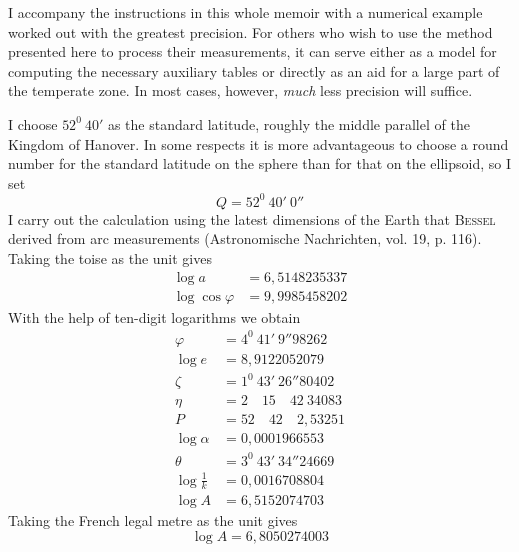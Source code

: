 \indent I accompany the instructions in this whole memoir with a numerical example worked out with the greatest precision. For others who wish to use the method presented here to process their measurements, it can serve either as a model for computing the necessary auxiliary tables or directly as an aid for a large part of the temperate zone. In most cases, however, \textit{much} less precision will suffice.

I choose \(52^0\ 40'\) as the standard latitude, roughly the middle parallel of the Kingdom of Hanover. In some respects it is more advantageous to choose a round number for the standard latitude on the sphere than for that on the ellipsoid, so I set
\[
Q=52^0\ 40'\ 0''
\]
\indent I carry out the calculation using the latest dimensions of the Earth that \textsc{Bessel} derived from arc measurements (Astronomische Nachrichten, vol. 19, p. 116). Taking the toise as the unit gives
\[
\begin{aligned}
\log a&=6{,}5148235337\\
\log\cos\varphi&=9{,}9985458202
\end{aligned}
\]
With the help of ten-digit logarithms we obtain
\[
\begin{aligned}
\varphi&=4^0\ 41'\ 9''98262\\
\log e&=8{,}9122052079\\
\zeta&=1^0\ 43'\ 26''80402\\
\eta&=2\quad15\quad42\ 34083\\
P&=52\quad42\quad2{,}53251\\
\log\alpha&=0{,}0001966553\\
\theta&=3^0\ 43'\ 34''24669\\
\log\frac{1}{k}&=0{,}0016708804\\
\log A&=6{,}5152074703
\end{aligned}
\]
Taking the French legal metre as the unit gives
\[
\log A=6{,}8050274003
\]
